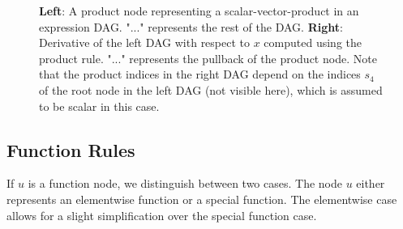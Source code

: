 \documentclass[12pt, a4paper]{report}
\begin{document}
\begin{figure}
    \centering
    \begin{minipage}{7cm}
        \centering
    \end{minipage}
    \begin{minipage}{7cm}
        \centering
    \end{minipage}
    \caption{\textbf{Left}: A product node representing a scalar-vector-product in an expression DAG. "..." represents the rest of the DAG. \textbf{Right}: Derivative of the left DAG with respect to $x$ computed using the product rule. "..." represents the pullback of the product node. Note that the product indices in the right DAG depend on the indices $s_4$ of the root node in the left DAG (not visible here), which is assumed to be scalar in this case.}
    \label{fig:prod_rule}
\end{figure}

\FloatBarrier
\subsection{Function Rules}
If $u$ is a function node, we distinguish between two cases.
The node $u$ either represents an elementwise function or a special function.
The elementwise case allows for a slight simplification over the special function case.
\end{document}
